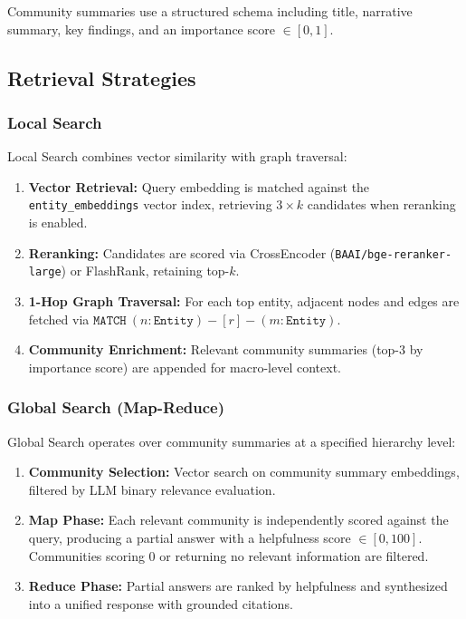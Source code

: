 \documentclass[11pt]{article}
\begin{document}
Community summaries use a structured schema including title, narrative summary, key findings, and an importance score $\in [0, 1]$.

\subsection{Retrieval Strategies}

\subsubsection{Local Search}

Local Search combines vector similarity with graph traversal:
\begin{enumerate}[leftmargin=*]
    \item \textbf{Vector Retrieval:} Query embedding is matched against the \texttt{entity\_embeddings} vector index, retrieving $3 \times k$ candidates when reranking is enabled.
    \item \textbf{Reranking:} Candidates are scored via CrossEncoder (\texttt{BAAI/bge-reranker-large}) or FlashRank, retaining top-$k$.
    \item \textbf{1-Hop Graph Traversal:} For each top entity, adjacent nodes and edges are fetched via $\texttt{MATCH}\ (n:\texttt{Entity})-[r]-(m:\texttt{Entity})$.
    \item \textbf{Community Enrichment:} Relevant community summaries (top-3 by importance score) are appended for macro-level context.
\end{enumerate}

\subsubsection{Global Search (Map-Reduce)}

Global Search operates over community summaries at a specified hierarchy level:
\begin{enumerate}[leftmargin=*]
    \item \textbf{Community Selection:} Vector search on community summary embeddings, filtered by LLM binary relevance evaluation.
    \item \textbf{Map Phase:} Each relevant community is independently scored against the query, producing a partial answer with a helpfulness score $\in [0, 100]$. Communities scoring 0 or returning no relevant information are filtered.
    \item \textbf{Reduce Phase:} Partial answers are ranked by helpfulness and synthesized into a unified response with grounded citations.
\end{enumerate}
\end{document}
